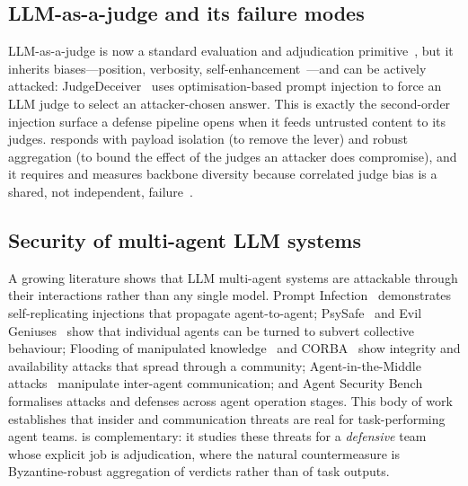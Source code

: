 \subsection{LLM-as-a-judge and its failure modes}
LLM-as-a-judge is now a standard evaluation and adjudication
primitive~\cite{zheng2023judging}, but it inherits biases—position, verbosity,
self-enhancement~\cite{wang2023notfair}—and can be actively attacked:
JudgeDeceiver~\cite{shi2024judgeinjection} uses optimisation-based prompt injection to
force an LLM judge to select an attacker-chosen answer. This is exactly the
second-order injection surface a defense pipeline opens when it feeds untrusted content
to its judges. \Aegis responds with payload isolation (to remove the lever) and robust
aggregation (to bound the effect of the judges an attacker does compromise), and it
requires and measures backbone diversity because correlated judge bias is a shared,
not independent, failure~\cite{kuncheva2003diversity}.

\subsection{Security of multi-agent LLM systems}
A growing literature shows that LLM multi-agent systems are attackable through their
interactions rather than any single model. Prompt Infection~\cite{lee2024promptinfection}
demonstrates self-replicating injections that propagate agent-to-agent;
PsySafe~\cite{zhang2024psysafe} and Evil Geniuses~\cite{tian2023evilgeniuses} show that
individual agents can be turned to subvert collective behaviour; Flooding of manipulated
knowledge~\cite{ju2024flooding} and CORBA~\cite{zhou2025corba} show integrity and
availability attacks that spread through a community; Agent-in-the-Middle
attacks~\cite{he2025redteaming} manipulate inter-agent communication; and Agent Security
Bench~\cite{zhang2024asb} formalises attacks and defenses across agent operation stages.
This body of work establishes that insider and communication threats are real for
task-performing agent teams. \Aegis is complementary: it studies these threats for a
\emph{defensive} team whose explicit job is adjudication, where the natural
countermeasure is Byzantine-robust aggregation of verdicts rather than of task outputs.

